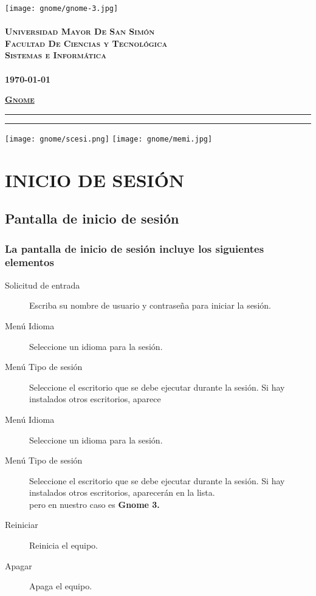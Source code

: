 \documentclass[12pt,letterpaper]{book}
\begin{document}
 \begin{titlepage}
	\thispagestyle{empty}
	\begin{center}
		\texttt{[image: gnome/gnome-3.jpg]} \\
		~\\
		\Large{\textsc{\bf Universidad Mayor De San Simón}}\\
		\large{\textsc{\bf Facultad De Ciencias y Tecnológica}}\\
		\large{\textsc{\bf Sistemas e Informática}}\\
		~\\
		\small{\bf \today}
	\end{center}
 	\vfill
	\begin{center}
		\Huge{\underline{\textsc{\bf Gnome}}}
	\end{center}
	\vfill
	\vfill
	\hrule
	\vspace{0.1cm}
	\hrule
	\vspace{0.2cm}
	\noindent\small{\texttt{[image: gnome/scesi.png]} \hfill \texttt{[image: gnome/memi.jpg]}}
\end{titlepage}

\tableofcontents
\part{INICIO DE SESIÓN}
\chapter{Pantalla de inicio de sesión}
\section{La pantalla de inicio de sesión incluye los siguientes elementos}
\begin{description}
\item[Solicitud de entrada] Escriba su nombre de usuario y contraseña para iniciar la sesión.
\item[Menú Idioma] Seleccione un idioma para la sesión.
\item [Menú Tipo de sesión] Seleccione el escritorio que se debe ejecutar durante la sesión. Si hay instalados otros escritorios, aparece
\item[Menú Idioma] Seleccione un idioma para la sesión.
\item [Menú Tipo de sesión] Seleccione el escritorio que se debe ejecutar durante la sesión. Si hay instalados otros escritorios, aparecerán en la lista.\\ pero en nuestro caso es {\bf Gnome 3.}
\item[Reiniciar] Reinicia el equipo.
\item[Apagar] Apaga el equipo.
\end{description}
\end{document}
